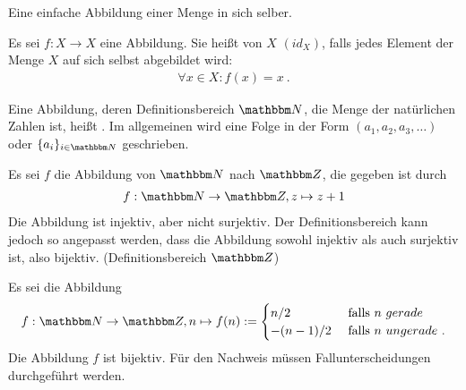 \begin{Unit}
Eine einfache Abbildung einer Menge in sich selber.
\begin{Definition}
  Es sei $f: X \rightarrow X$ eine Abbildung. Sie heißt  
  von $X$ $(id_X)$, falls jedes Element der Menge $X$ auf sich selbst 
  abgebildet wird:
  \begin{align}
    \forall x \in X: f(x) = x \ .
  \end{align}
\end{Definition}
\end{Unit} 

\begin{Unit}[Anmerkung] 
Eine Abbildung, deren Definitionsbereich $\NN$, die Menge der natürlichen 
Zahlen ist, heißt . Im allgemeinen wird eine Folge in der Form 
$(a_1, a_2, a_3, \ldots)$ oder $\{a_i\}_{i \in \NN}$ geschrieben.
\end{Unit} 

\begin{Unit}[Beispiel] 
  Es sei $f$ die Abbildung von $\NN$ nach $\ZZ$, die gegeben ist durch
  \begin{align}
    f:\NN \rightarrow \ZZ, z \mapsto z+1
  \end{align}
  Die Abbildung ist injektiv, aber nicht surjektiv. Der Definitionsbereich
  kann jedoch so angepasst werden, dass die Abbildung sowohl injektiv als
  auch surjektiv ist, also bijektiv. (Definitionsbereich $\ZZ$)
\end{Unit}

\begin{Unit}[Beispiel] 
  Es sei die Abbildung
  \begin{align}
    f: \NN \rightarrow \ZZ, n \mapsto f(n) := 
    \begin{cases} 
      n/2      & \text{ falls }n{\ gerade } \\ 
      -(n-1)/2 & \text{ falls }n{\ ungerade } \ .
    \end{cases}
  \end{align}
  Die Abbildung $f$ ist bijektiv. Für den Nachweis müssen 
  Fallunterscheidungen durchgeführt werden.
\end{Unit}

